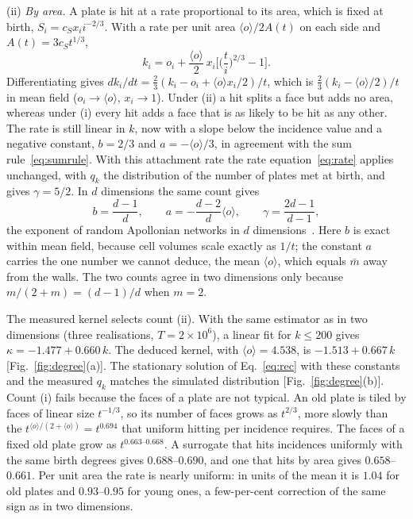\documentclass[pre,twocolumn,superscriptaddress,amsmath,amssymb,floatfix]{revtex4-2}
\begin{document}
(ii) \emph{By area.} A plate is hit at a rate proportional to its area, which is fixed at
birth, $S_i=c_Sx_ii^{-2/3}$. With a rate per unit area $\langle o\rangle/2A(t)$ on each side
and $A(t)=3c_St^{1/3}$,
\begin{equation}
  k_i=o_i+\frac{\langle o\rangle}{2}\,x_i\Big[\Big(\frac{t}{i}\Big)^{2/3}-1\Big].
  \label{eq:k3d}
\end{equation}
Differentiating gives $dk_i/dt=\tfrac23(k_i-o_i+\langle o\rangle x_i/2)/t$, which is
$\tfrac23(k_i-\langle o\rangle/2)/t$ in mean field ($o_i\to\langle o\rangle$, $x_i\to1$). Under (ii) a hit
splits a face but adds no area, whereas under (i) every hit adds a face that is as
likely to be hit as any other. The rate is still linear in $k$, now with a slope below
the incidence value and a negative constant, $b=2/3$ and $a=-\langle o\rangle/3$, in agreement with the sum
rule~\eqref{eq:sumrule}. With this attachment rate the rate equation~\eqref{eq:rate}
applies unchanged, with $q_k$ the distribution of the number of plates met at birth, and gives
$\gamma=5/2$. In $d$ dimensions the same count gives
\begin{equation}
  b=\frac{d-1}{d},\qquad a=-\frac{d-2}{d}\langle o\rangle,\qquad
  \gamma=\frac{2d-1}{d-1},
  \label{eq:bd}
\end{equation}
the exponent of random Apollonian networks in $d$ dimensions~\cite{kolossvary2016}.
Here $b$ is exact within mean field, because cell volumes scale exactly as $1/t$; the
constant $a$ carries the one number we cannot deduce, the mean $\langle o\rangle$, which
equals $\bar m$ away from the walls. The two counts
agree in two dimensions only because $m/(2+m)=(d-1)/d$ when $m=2$.

The measured kernel selects count (ii). With the same estimator as in two dimensions
(three realisations, $T=2\times10^6$), a linear fit for $k\le200$ gives $\kappa=-1.477+0.660\,k$. The deduced kernel, with $\langle o\rangle=4.538$,
is $-1.513+0.667\,k$ [Fig.~\ref{fig:degree}(a)].
The stationary solution of Eq.~\eqref{eq:rec} with these constants and the measured
$q_k$ matches the simulated distribution [Fig.~\ref{fig:degree}(b)]. Count (i) fails because the faces of a plate are not
typical. An old plate is tiled by faces of linear size $t^{-1/3}$, so its number of
faces grows as $t^{2/3}$, more slowly than the $t^{\langle o\rangle/(2+\langle o\rangle)}=t^{0.694}$
that uniform hitting per incidence requires. The faces of a fixed old plate grow as $t^{0.663\text{--}0.668}$. A surrogate that hits
incidences uniformly with the same birth degrees gives $0.688$--$0.690$, and one that
hits by area gives $0.658$--$0.661$. Per unit area the rate is nearly uniform: in units
of the mean it is $1.04$ for old plates and $0.93$--$0.95$ for young ones, a few-per-cent
correction of the same sign as in two dimensions.
\end{document}
